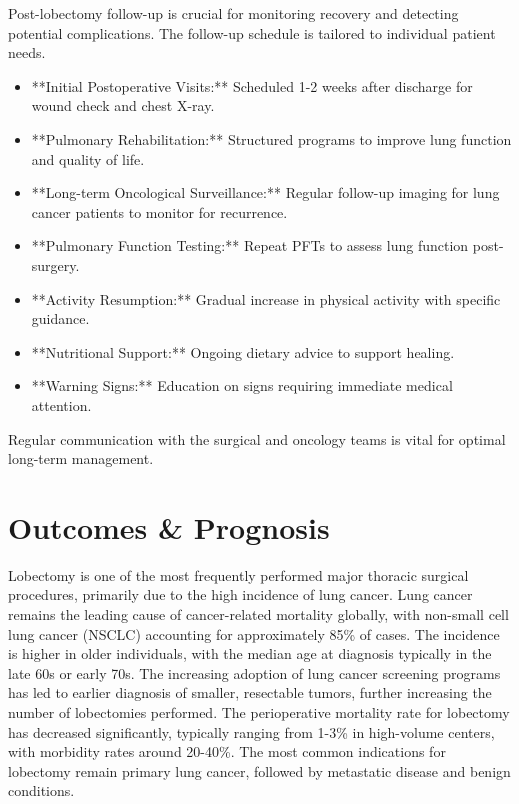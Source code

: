 Post-lobectomy follow-up is crucial for monitoring recovery and detecting potential complications. The follow-up schedule is tailored to individual patient needs.

\begin{itemize}
  \item **Initial Postoperative Visits:** Scheduled 1-2 weeks after discharge for wound check and chest X-ray.
  \item **Pulmonary Rehabilitation:** Structured programs to improve lung function and quality of life.
  \item **Long-term Oncological Surveillance:** Regular follow-up imaging for lung cancer patients to monitor for recurrence.
  \item **Pulmonary Function Testing:** Repeat PFTs to assess lung function post-surgery.
  \item **Activity Resumption:** Gradual increase in physical activity with specific guidance.
  \item **Nutritional Support:** Ongoing dietary advice to support healing.
  \item **Warning Signs:** Education on signs requiring immediate medical attention.
\end{itemize}

Regular communication with the surgical and oncology teams is vital for optimal long-term management.

\section*{Outcomes \& Prognosis}
Lobectomy is one of the most frequently performed major thoracic surgical procedures, primarily due to the high incidence of lung cancer. Lung cancer remains the leading cause of cancer-related mortality globally, with non-small cell lung cancer (NSCLC) accounting for approximately 85\% of cases. The incidence is higher in older individuals, with the median age at diagnosis typically in the late 60s or early 70s. The increasing adoption of lung cancer screening programs has led to earlier diagnosis of smaller, resectable tumors, further increasing the number of lobectomies performed. The perioperative mortality rate for lobectomy has decreased significantly, typically ranging from 1-3\% in high-volume centers, with morbidity rates around 20-40\%. The most common indications for lobectomy remain primary lung cancer, followed by metastatic disease and benign conditions.

